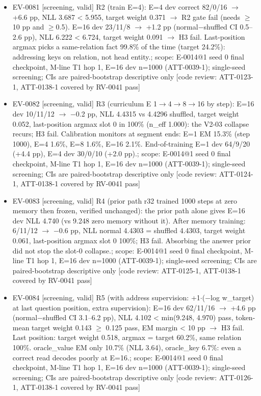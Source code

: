 \documentclass[11pt]{article}
\begin{document}
\begin{itemize}
\item EV-0081 [screening, valid] R2 (train E=4): E=4 dev correct 82/0/16 \ensuremath{\rightarrow} +6.6 pp, NLL 3.687 \textless{} 5.955, target weight 0.371 \ensuremath{\rightarrow} R2 gate fail (needs \ensuremath{\geq}10 pp and \ensuremath{\geq}0.5). E=16 dev 23/11/8 \ensuremath{\rightarrow} +1.2 pp (normal\ensuremath{-}shuffled CI 0.5--2.6 pp), NLL 6.222 \textless{} 6.724, target weight 0.091 \ensuremath{\rightarrow} H3 fail. Last-position argmax picks a same-relation fact 99.8\% of the time (target 24.2\%): addressing keys on relation, not head entity.; scope: E-0014@1 seed 0 final checkpoint, M-line T1 hop 1, E=16 dev n=1000 (ATT-0039-1); single-seed screening; CIs are paired-bootstrap descriptive only [code review: ATT-0123-1, ATT-0138-1 covered by RV-0041 pass]
\item EV-0082 [screening, valid] R3 (curriculum E 1\ensuremath{\rightarrow}4\ensuremath{\rightarrow}8\ensuremath{\rightarrow}16 by step): E=16 dev 10/11/12 \ensuremath{\rightarrow} \ensuremath{-}0.2 pp, NLL 4.4315 vs 4.4296 shuffled, target weight 0.052, last-position argmax slot 0 in 100\% (n\_eff 1.000): the V2-03 collapse recurs; H3 fail. Calibration monitors at segment ends: E=1 EM 15.3\% (step 1000), E=4 1.6\%, E=8 1.6\%, E=16 2.1\%. End-of-training E=1 dev 64/9/20 (+4.4 pp), E=4 dev 30/0/10 (+2.0 pp).; scope: E-0014@1 seed 0 final checkpoint, M-line T1 hop 1, E=16 dev n=1000 (ATT-0039-1); single-seed screening; CIs are paired-bootstrap descriptive only [code review: ATT-0124-1, ATT-0138-1 covered by RV-0041 pass]
\item EV-0083 [screening, valid] R4 (prior path r32 trained 1000 steps at zero memory then frozen, verified unchanged): the prior path alone gives E=16 dev NLL 4.740 (vs 9.248 zero memory without it). After memory training: 6/11/12 \ensuremath{\rightarrow} \ensuremath{-}0.6 pp, NLL normal 4.4303 = shuffled 4.4303, target weight 0.061, last-position argmax slot 0 100\%; H3 fail. Absorbing the answer prior did not stop the slot-0 collapse.; scope: E-0014@1 seed 0 final checkpoint, M-line T1 hop 1, E=16 dev n=1000 (ATT-0039-1); single-seed screening; CIs are paired-bootstrap descriptive only [code review: ATT-0125-1, ATT-0138-1 covered by RV-0041 pass]
\item EV-0084 [screening, valid] R5 (with address supervision: +1\ensuremath{\cdot}(\ensuremath{-}log w\_target) at last question position, extra supervision): E=16 dev 62/11/16 \ensuremath{\rightarrow} +4.6 pp (normal\ensuremath{-}shuffled CI 3.1--6.2 pp), NLL 4.102 \textless{} min(9.248, 4.970) pass, token-mean target weight 0.143 \ensuremath{\geq} 0.125 pass, EM margin \textless{} 10 pp \ensuremath{\rightarrow} H3 fail. Last position: target weight 0.518, argmax = target 60.2\%, same relation 100\%. oracle\_value EM only 10.7\% (NLL 3.64), oracle\_key 6.7\%: even a correct read decodes poorly at E=16.; scope: E-0014@1 seed 0 final checkpoint, M-line T1 hop 1, E=16 dev n=1000 (ATT-0039-1); single-seed screening; CIs are paired-bootstrap descriptive only [code review: ATT-0126-1, ATT-0138-1 covered by RV-0041 pass]

\end{itemize}
\end{document}
